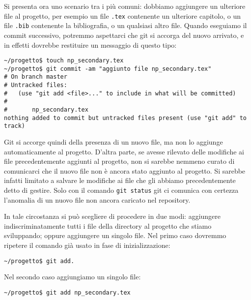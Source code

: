 \documentclass[a4paper,12pt,oneside]{article}
\begin{document}
Si presenta ora uno scenario tra i più comuni: dobbiamo aggiungere un ulteriore
file al progetto, per esempio un file \lstinline|.tex| contenente un ulteriore
capitolo, o un file \lstinline|.bib| contenente la bibliografia, o un qualsiasi
altro file. Quando eseguiamo il commit successivo, potremmo aspettarci che git
si accorga del nuovo arrivato, e in effetti dovrebbe restituire un messaggio di
questo tipo:
\begin{lstlisting}
~/progetto$ touch np_secondary.tex
~/progetto$ git commit -am "aggiunto file np_secondary.tex"
# On branch master
# Untracked files:
#   (use "git add <file>..." to include in what will be committed)
#
#       np_secondary.tex
nothing added to commit but untracked files present (use "git add" to track)
\end{lstlisting}

Git si accorge quindi della presenza di un nuovo file, ma non lo aggiunge
automaticamente al progetto. D'altra parte, se avesse rilevato delle modifiche
ai file precedentemente aggiunti al progetto, non si sarebbe nemmeno curato di
comunicarci che il nuovo file non è ancora stato aggiunto al progetto. Si
sarebbe infatti limitato a salvare le modifiche ai file che gli abbiamo
precedentemente detto di gestire. Solo con il comando \lstinline|git status|
git ci comunica con certezza l'anomalia di un nuovo file non ancora caricato nel
repository.

In tale circostanza si può scegliere di procedere in due modi:
aggiungere indiscriminatamente tutti i file della directory al progetto che
stiamo sviluppando; oppure aggiungere un singolo file. Nel primo caso dovremmo
ripetere il comando già usato in fase di inizializzazione:
\begin{lstlisting}
~/progetto$ git add.
\end{lstlisting}
Nel secondo caso aggiungiamo un singolo file:
\begin{lstlisting}
~/progetto$ git add np_secondary.tex
\end{lstlisting}
\end{document}
